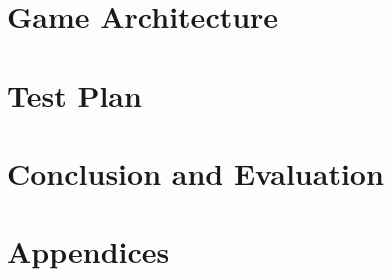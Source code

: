 \documentclass[11pt, a4paper]{article}
\begin{document}
\clearpage
\section{Game Architecture}

\clearpage

\clearpage

\clearpage

\clearpage


\newpage
\section{Test Plan}



\clearpage

\clearpage

\clearpage


\clearpage

\clearpage

\clearpage

\clearpage

\clearpage

\clearpage


\clearpage
\section{Conclusion and Evaluation}




\newpage

\clearpage

\section*{Appendices}
\appendix

\clearpage

\clearpage

\clearpage

\clearpage

\clearpage

\clearpage

\end{document}
